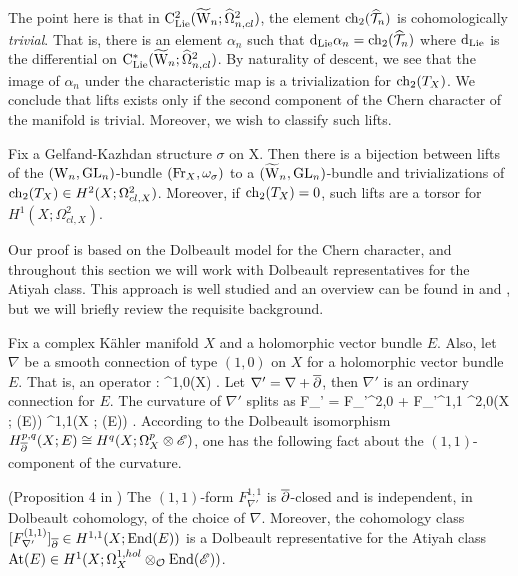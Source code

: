 The point here is that in ${\rm C}_{{\rm Lie}}^2(\widetilde{{{\rm W}}}_n ; \widehat{\Omega}^2_{n,cl})$, 
the element ${\rm ch}_2(\widehat{\mathcal T}_n)$ is cohomologically {\em trivial}. 
That is, there
is an element $\alpha_n$ such that ${\rm d}_{\rm Lie} \alpha_n = {\rm ch}_2(\widehat{\mathcal T}_n)$ where
${\rm d}_{\rm Lie}$ is the differential on ${\rm C}_{{\rm Lie}}^*(\widetilde{{{\rm W}}}_n ;
\widehat{\Omega}^2_{n,cl})$. By naturality of descent, we see that the image of
$\alpha_n$ under the characteristic map is a trivialization for
${\rm ch}_2(T_X)$. We conclude that lifts exists only if the second
component of the Chern character of
the manifold is trivial. Moreover, we wish to classify such lifts.

\begin{thm}\label{extbundle} 
Fix a Gelfand-Kazhdan structure $\sigma$ on X. 
Then there is a bijection between  lifts of the $({{\rm W}_n}, {\rm GL}_n)$-bundle $({\rm Fr}_X, \omega_\sigma)$ to a $(\widetilde{{{\rm W}}}_n, {\rm GL}_n)$-bundle 
and trivializations of ${\rm ch}_2(T_X) \in H^2(X ; \Omega^{2}_{cl,X})$.
Moreover, if ${\rm ch}_2(T_X) = 0$, such lifts are a torsor for $H^1(X; \Omega^{2}_{cl,X})$. 
\end{thm}

Our proof is based on the Dolbeault model for the Chern character, and
throughout this section we will work with Dolbeault representatives for the Atiyah class. 
This approach is well studied and an overview can be found in \cite{atiyah} and \cite{kapranov1999}, 
but we will briefly review the requisite background.

Fix a complex K\"ahler manifold $X$ and a holomorphic vector bundle $E$. 
Also, let $\nabla$ be a smooth connection of type $(1,0)$ on $X$ for a
holomorphic vector bundle $E$. That is, an operator
\ben
\nabla : \sE \to \Omega^{1,0}(X) \tensor \sE .
\een
Let $\nabla ' = \nabla + \overline{\partial}$, then $\nabla'$ is an ordinary
connection for $E$. The curvature of $\nabla '$ splits as
\ben
F_{\nabla'} = F_{\nabla '}^{2,0} + F_{\nabla '}^{1,1} \in \Omega^{2,0}(X
; \End(E)) \oplus \Omega^{1,1}(X ; \End(E)) .
\een 
According to the Dolbeault isomorphism 
$H^{p,q}_{\overline{\partial}} (X ; E) \cong H^q(X ;  \Omega^p_X \otimes \mathscr E)$, 
one has the following fact about the $(1,1)$-component of the curvature. 

\begin{prop} (Proposition 4 in \cite{atiyah})
The $(1,1)$-form $F_{\nabla'}^{1,1}$ is $\overline{\partial}$-closed  and is independent, in Dolbeault cohomology, of the choice of $\nabla$. 
Moreover, the cohomology class $[F_{\nabla'}^{(1,1)}]_{\overline{\partial}} \in H^{1,1}(X ; {\rm End}(E))$ is a Dolbeault representative for the Atiyah class ${\rm At}(E) \in H^1(X ; \Omega^{1,hol}_X \otimes_{\mathcal O} {\rm End}(\mathscr E))$.
\end{prop}

